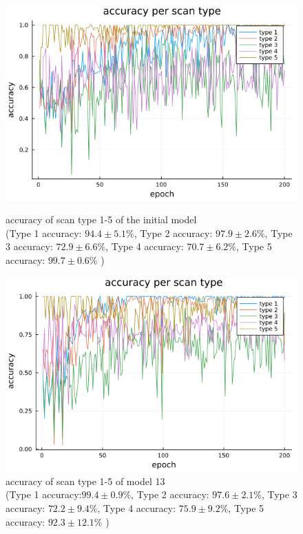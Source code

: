 \documentclass[
a4paper, 
12pt,
grayscalebody, %
abstract=on,
twoside, BCOR10mm, 12pt, DIV13,headinclude, footexclude, final, abstracton, openright
]{ibireprt}
\numberwithin{equation}{chapter}
\numberwithin{table}{chapter}
\numberwithin{figure}{chapter}
\numberwithin{algorithm}{chapter}
\numberwithin{example}{chapter}
\numberwithin{example}{chapter}
\begin{document}
\begin{figure}[h]
	\centering
	\begin{minipage}[t]{.45\linewidth}
		\centering
		\includegraphics[width = \textwidth]{accuracy_per_scan_type_final_run_6_2.png}%
		\captionsetup{width=\textwidth}
		\caption{accuracy of scan type 1-5 of the initial model \\ (Type 1 accuracy: $94.4\pm5.1\%$, Type 2 accuracy: $97.9\pm2.6\%$, Type 3 accuracy: $72.9\pm6.6\%$, Type 4 accuracy: $70.7\pm6.2\%$, Type 5 accuracy: $99.7\pm0.6\%$ )}
		\label{fig:fig_max_pooling}
		
	\end{minipage}
	\hfill
	\begin{minipage}[t]{.45\linewidth}
		\centering
		\includegraphics[width = \textwidth]{accuracy_per_scan_type_final_run_6_1.png}%
		\caption{accuracy of scan type 1-5 of model 13 \\(Type 1 accuracy:$99.4\pm0.9\%$, Type 2 accuracy: $97.6\pm2.1\%$, Type 3 accuracy: $72.2\pm9.4\%$, Type 4 accuracy: $75.9\pm9.2\%$, Type 5 accuracy: $92.3\pm12.1\%$  ) }
		\label{fig:fig_average_pooling}
	\end{minipage}
\end{figure}
\end{document}

